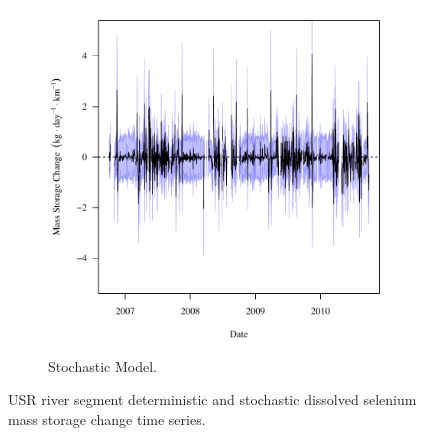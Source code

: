 \begin{landscape}
\begin{figure}
\begin{subfigure}{0.7\textwidth}
			\includegraphics[width=\tableCustomSize]{"Figures/Results_USR/Stochastic/f Segment E"}
			\caption{Stochastic Model.}
		\end{subfigure}
		\caption{USR river segment deterministic and stochastic dissolved selenium mass storage change time series.}
	\end{figure}
\end{landscape}



